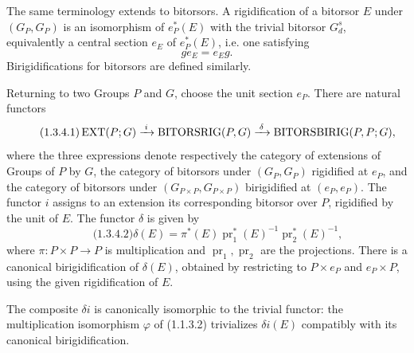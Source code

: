 \documentclass[11pt]{article}
\providecommand{\pr}{\operatorname{pr}}
\begin{document}
The same terminology extends to bitorsors.  A rigidification of a bitorsor \(E\) under \((G_P,G_P)\) is an isomorphism of \(e_P^*(E)\) with the trivial bitorsor \(G_d^s\), equivalently a central section \(e_E\) of \(e_P^*(E)\), i.e. one satisfying
\[
  g e_E=e_E g.
\]
Birigidifications for bitorsors are defined similarly.

Returning to two Groups \(P\) and \(G\), choose the unit section \(e_P\).  There are natural functors
\begin{equation}\qquad\text{(1.3.4.1)}
  \operatorname{EXT}(P;G)\xrightarrow{\;i\;}\operatorname{BITORSRIG}(P,G)
  \xrightarrow{\;\delta\;}\operatorname{BITORSBIRIG}(P,P;G),
\end{equation}
where the three expressions denote respectively the category of extensions of Groups of \(P\) by \(G\), the category of bitorsors under \((G_P,G_P)\) rigidified at \(e_P\), and the category of bitorsors under \((G_{P\times P},G_{P\times P})\) birigidified at \((e_P,e_P)\).  The functor \(i\) assigns to an extension its corresponding bitorsor over \(P\), rigidified by the unit of \(E\).  The functor \(\delta\) is given by
\begin{equation}\qquad\text{(1.3.4.2)}
  \delta(E)=\pi^*(E)\pr_1^*(E)^{-1}\pr_2^*(E)^{-1},
\end{equation}
where \(\pi:P\times P\to P\) is multiplication and \(\pr_1,\pr_2\) are the projections.  There is a canonical birigidification of \(\delta(E)\), obtained by restricting to \(P\times e_P\) and \(e_P\times P\), using the given rigidification of \(E\).

The composite \(\delta i\) is canonically isomorphic to the trivial functor: the multiplication isomorphism \(\varphi\) of (1.1.3.2) trivializes \(\delta i(E)\) compatibly with its canonical birigidification.
\end{document}
